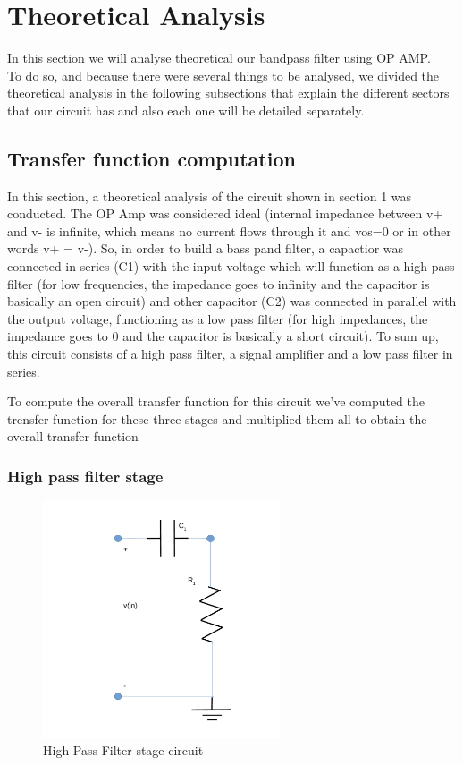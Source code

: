 \section{Theoretical Analysis}
\label{sec:analysis}

In this section we will analyse theoretical our bandpass filter using OP AMP. \\
To do so, and because there were several things to be analysed, we divided the theoretical analysis in the following subsections that explain the different sectors that our circuit has and also each one will be detailed separately.\\

\subsection{Transfer function computation}

In this section, a theoretical analysis of the circuit shown in section 1 was conducted. The OP Amp was considered ideal (internal impedance between v+ and v- is infinite, which means no current flows through it and vos=0 or in other words v+ = v-). So, in order to build a bass pand filter, a capactior was connected in series (C1) with the input voltage which will function as a high pass filter (for low frequencies, the impedance goes to infinity and the capacitor is basically an open circuit)  and other capacitor (C2) was connected in parallel with the output voltage, functioning as a low pass filter (for high impedances, the impedance goes to 0 and the capacitor is basically a short circuit). To sum up, this circuit consists of a high pass filter, a signal amplifier and a low pass filter in series.

To compute the overall transfer function for this circuit we've computed the trensfer function for these three stages and multiplied them all to obtain the overall transfer function

\subsubsection{High pass filter stage}

\begin{figure}[H] 
\centering
\includegraphics[width= 7cm]{high_pass_l5.pdf} 
\caption{High Pass Filter stage circuit}
\label{hf}
\end{figure}

